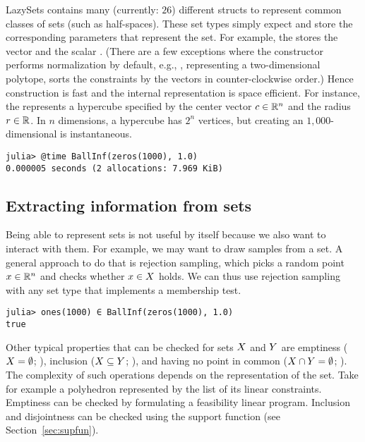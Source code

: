 \smallskip

LazySets contains many (currently: $26$) different structs to represent common classes of sets (such as half-spaces).
These set types simply expect and store the corresponding parameters that represent the set.
For example, the  stores the vector  and the scalar .
(There are a few exceptions where the constructor performs normalization by default, e.g., , representing a two-dimensional polytope, sorts the constraints by the vectors  in counter-clockwise order.)
Hence construction is fast and the internal representation is space efficient.
For instance, the  represents a hypercube specified by the center vector $c \in \mathbb{R}^n$ and the radius $r \in \mathbb{R}$.
In $n$ dimensions, a hypercube has $2^n$ vertices, but creating an $1{,}000$-dimensional  is instantaneous.

\begin{minipage}{\linewidth}
\vspace{-\abovedisplayskip}
\begin{lstlisting}
julia> @time BallInf(zeros(1000), 1.0)
0.000005 seconds (2 allocations: 7.969 KiB)
\end{lstlisting}
\end{minipage}


\subsection{Extracting information from sets}

Being able to represent sets is not useful by itself because we also want to interact with them.
For example, we may want to draw samples from a set.
A general approach to do that is rejection sampling, which picks a random point $x \in \mathbb{R}^n$ and checks whether $x \in X$ holds.
We can thus use rejection sampling with any set type that implements a membership test.

\begin{minipage}{\linewidth}
\vspace{-\abovedisplayskip}
\begin{lstlisting}
julia> ones(1000) ∈ BallInf(zeros(1000), 1.0)
true
\end{lstlisting}
\end{minipage}

Other typical properties that can be checked for sets $X$ and $Y$ are emptiness ($X = \emptyset$; ), inclusion ($X \subseteq Y$; ), and having no point in common ($X \cap Y = \emptyset$; ).
The complexity of such operations depends on the representation of the set.
Take for example a polyhedron represented by the list of its linear constraints.
Emptiness can be checked by formulating a feasibility linear program.
Inclusion and disjointness can be checked using the support function (see Section~\ref{sec:supfun}).

